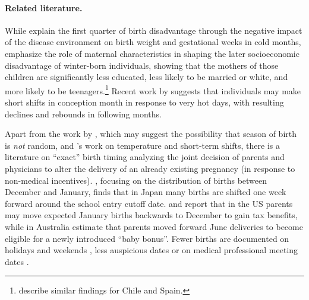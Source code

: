 \documentclass[a4paper, 11.5 pt]{article}
\theoremstyle{plain}
\begin{document}
\begin{doublespace}


\paragraph{Related literature.} While \citet{CS2013} explain the first quarter of birth disadvantage through the negative impact of the disease environment on birth weight and gestational weeks in cold months, \citet{BucklesHungerman2013} emphasize the role of maternal characteristics in shaping the later socioeconomic disadvantage of winter-born individuals, showing that the mothers of those children are significantly less educated, less likely to be married or white, and more likely to be teenagers.\footnote{\citet{AlbaCaceres2014} describe similar findings for Chile and Spain.} Recent work by \citet{Barrecaetal2015} suggests that individuals may make short shifts in conception month in response to very hot days, with resulting declines and rebounds in following months.

Apart from the work by \citet{BucklesHungerman2013}, which may suggest the possibility that season of birth is \emph{not} random, and \citet{Barrecaetal2015}'s work on temperature and short-term shifts, there is a literature on ``exact'' birth timing analyzing the joint decision of parents and physicians to alter the delivery of an already existing pregnancy (in response to non-medical incentives). \citet{Shigeoka2015}, focusing on the distribution of births between December and January,  finds that in Japan many births are shifted one week forward around the school entry cutoff date. \citet{DCChandra1999} and \citet{LaLumiaetal2015} report that in the US parents may move expected January births backwards to December to gain tax benefits, while in Australia \citet{GansLeigh2009} estimate that parents moved forward June deliveries to become eligible for a newly introduced ``baby bonus''. Fewer births are documented on holidays \citep{Rindfuss1979} and weekends \citep{Gould2003}, less auspicious dates \citep{Almond15} or on medical professional meeting dates \citep{GLV2007}. 


\end{doublespace}
\end{document}
